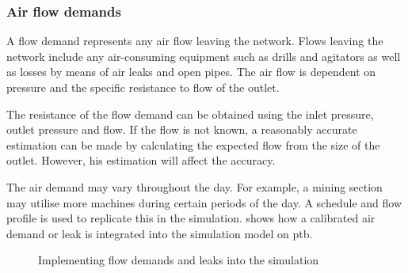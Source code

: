 		\subsubsection{Air flow demands}
			A flow demand represents any air flow leaving the network. Flows leaving the network include any air-consuming equipment such as drills and agitators as well as losses by means of air leaks and open pipes. The air flow is dependent on pressure and the specific resistance to flow of the outlet. 
			\par 
			The resistance of the flow demand can be obtained using the inlet pressure, outlet pressure and flow. If the flow is not known, a reasonably accurate estimation can be made by calculating the expected flow from the size of the outlet. However, his estimation will affect the accuracy.
			\par
			 The air demand may vary throughout the day. For example, a mining section may utilise more machines during certain periods of the day. A schedule and flow profile is used to replicate this in the simulation.  shows how a calibrated air demand or leak is integrated into the simulation model on \gls{ptb}.
			\begin{figure}[h]
				\centering
				\caption{Implementing flow demands and leaks into the simulation} 
				\label{fig: Demand component}
			\end{figure}
